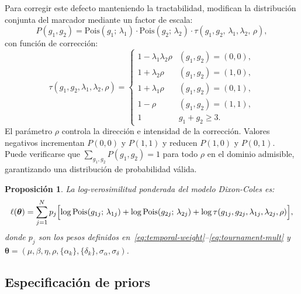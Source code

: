 \documentclass[12pt,a4paper]{article}
\newtheorem{proposition}{Proposición}
\begin{document}
Para corregir este defecto manteniendo la tractabilidad, \citet{dixon1997modelling}
modifican la distribución conjunta del marcador mediante un factor de escala:
\begin{equation}
  P(g_1, g_2) = \text{Pois}(g_1;\, \lambda_1) \cdot \text{Pois}(g_2;\, \lambda_2)
               \cdot \tau(g_1, g_2,\, \lambda_1, \lambda_2,\, \rho),
  \label{eq:dc-joint}
\end{equation}
con función de corrección:
\begin{equation}
  \tau(g_1, g_2, \lambda_1, \lambda_2, \rho) = \begin{cases}
    1 - \lambda_1 \lambda_2 \rho & (g_1, g_2) = (0,0), \\
    1 + \lambda_2 \rho           & (g_1, g_2) = (1,0), \\
    1 + \lambda_1 \rho           & (g_1, g_2) = (0,1), \\
    1 - \rho                     & (g_1, g_2) = (1,1), \\
    1                            & g_1 + g_2 \geq 3.
  \end{cases}
  \label{eq:tau}
\end{equation}
El parámetro $\rho$ controla la dirección e intensidad de la corrección.
Valores negativos incrementan $P(0,0)$ y $P(1,1)$ y reducen $P(1,0)$ y $P(0,1)$.
Puede verificarse que $\sum_{g_1,g_2} P(g_1, g_2) = 1$ para todo $\rho$ en el
dominio admisible, garantizando una distribución de probabilidad válida.

\begin{proposition}
La log-verosimilitud ponderada del modelo Dixon-Coles es:
\begin{equation}
  \ell(\boldsymbol{\theta}) = \sum_{j=1}^{N} p_j \Bigl[
    \log \operatorname{Pois}(g_{1j};\, \lambda_{1j}) +
    \log \operatorname{Pois}(g_{2j};\, \lambda_{2j}) +
    \log \tau(g_{1j}, g_{2j}, \lambda_{1j}, \lambda_{2j}, \rho)
  \Bigr],
  \label{eq:loglik}
\end{equation}
donde $p_j$ son los pesos definidos en~\eqref{eq:temporal-weight}--\eqref{eq:tournament-mult}
y $\boldsymbol{\theta} = (\mu, \beta, \eta, \rho, \{\alpha_k\}, \{\delta_k\}, \sigma_\alpha, \sigma_\delta)$.
\end{proposition}

\subsection{Especificación de priors}
\end{document}
